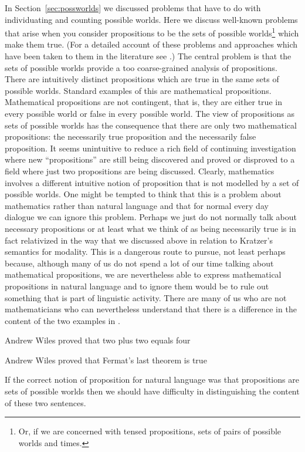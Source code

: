 In Section~\ref{sec:possworlds} we discussed problems that have to do
with individuating and counting possible worlds.  Here we discuss
well-known problems that arise when you consider propositions to be
the sets of possible worlds\footnote{Or, if we are concerned with
  tensed propositions, sets of pairs of possible worlds and times.}
which make them true. (For a detailed account of these problems and
approaches which have been taken to them in the literature see \citealp{Egre2020}.)  The central problem is that the sets of
possible worlds provide a too coarse-grained analysis of
propositions.  There are intuitively distinct propositions which are
true in the same sets of possible worlds.  Standard examples of this
are mathematical propositions.  Mathematical propositions are not
contingent, that is, they are either true in every possible world or
false in every possible world.  The view of propositions as sets of
possible worlds has the consequence that there
are only two mathematical propositions: the necessarily true
proposition and the necessarily false proposition.  It seems
unintuitive to reduce a rich field of continuing investigation where
new ``propositions'' are still being discovered and proved or
disproved to a field where just two propositions are being discussed.
Clearly, mathematics involves a different intuitive notion of
proposition that is not modelled by a set of possible worlds.  One
might be tempted to think that this is a problem about mathematics
rather than natural language and that for normal every day dialogue we
can ignore this problem.  Perhaps we just do not normally talk about
necessary propositions or at least what we think of as being
necessarily true is in fact relativized in the way that we discussed
above in relation to Kratzer's semantics for modality.  This is a
dangerous route to pursue, not least perhaps because, although many of
us do not spend a lot of our time talking about mathematical
propositions, we are nevertheless able to express mathematical
propositions in natural language and to ignore them would be to rule
out something that is part of linguistic activity.  There are many of
us who are not mathematicians who can nevertheless understand that
there is a difference in the content of the two examples in \nexteg{}.
\begin{ex} 
\begin{subex} 
 
\item Andrew Wiles proved that two plus two equals four 
 
\item Andrew Wiles proved that Fermat's last theorem is true 
 
\end{subex} 
   
\end{ex} 
If the correct notion of proposition for natural language was that
propositions are sets of possible worlds then we should have
difficulty in distinguishing the content of these two sentences.

